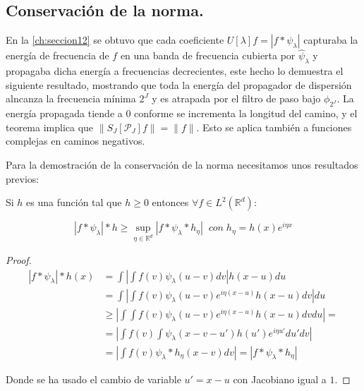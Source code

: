\subsection{Conservación de la norma.}

En la \autoref{ch:seccion12} se obtuvo que cada coeficiente $U[\lambda]f=|f \ast \psi_\lambda|$ capturaba la energía de frecuencia de $f$ en una banda de frecuencia cubierta por $\widehat{\psi}_\lambda$ y propagaba dicha energía a frecuencias decrecientes, este hecho lo demuestra el siguiente resultado, mostrando que toda la energía del propagador de dispersión alncanza la frecuencia mínima $2^J$ y es atrapada por el filtro de paso bajo $\phi_ {2^J}$. La energía propagada tiende a $0$ conforme se incrementa la longitud del camino, y el teorema implica que $\|S_J[\mathcal{P}_J]f\|=\|f\|$. Esto se aplica también a funciones complejas en caminos negativos.

\medskip

\noindent Para la demostración de la conservación de la norma necesitamos unos resultados previos: 

\begin{lema} \label{lema::Cota_inferior}
  Si $h$ es una función tal que $h\geq 0$ entonces $\forall f \in L^2(\mathbb{R}^d)$: 
  
  \begin{equation}
    |f \ast \psi_\lambda | \ast h \geq \sup_{\eta \in \mathbb{R}^d} |f\ast \psi_\lambda \ast h_\eta | \; \; con \; h_\eta=h(x)e^{i\eta x}
  \end{equation}
\end{lema}
  
\begin{proof}
  
  \begin{align*}
      |f \ast \psi_\lambda | \ast h (x) &= \int \left| \int f(v)\psi_\lambda(u-v)dv \right| h(x-u)du \\
      &=\int \left | \int f(v) \psi_\lambda(u-v) e^{i\eta(x-u)} h(x-u) dv \right| du \\
      &\geq \left | \int \int f(v) \psi_\lambda(u-v) e^{i\eta(x-u)} h(x-u) dv du \right| = \\
      &= \left | \int f(v) \int  \psi_\lambda(x-v-u')h(u') e^{i\eta u'}  du' dv \right| \\
      &= \left | \int f(v) \psi_\lambda \ast h_\eta(x-v) dv \right| = |f\ast \psi_\lambda \ast h_\eta|
  \end{align*}

  \noindent Donde se ha usado el cambio de variable $u'=x-u$ con Jacobiano igual a $1$.
\end{proof}

